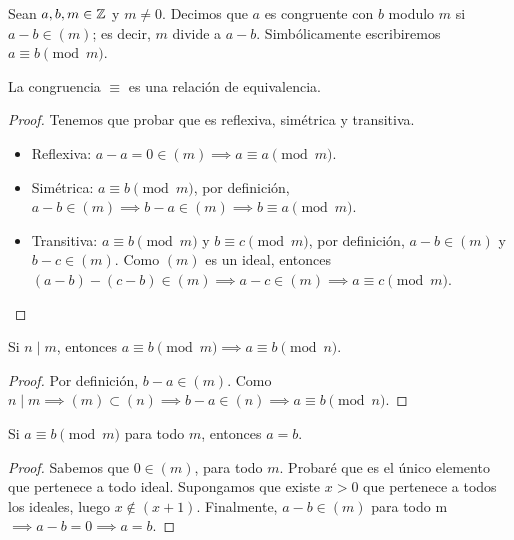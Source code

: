 \documentclass[main.tex]{subfiles}
\begin{document}
\begin{defn}
    Sean $a, b, m \in \mathbb Z$ y $m \not= 0$. Decimos que $a$ es congruente con $b$ modulo $m$ si $a - b \in (m)$; es decir, $m$ divide a $a - b$. Simb\'olicamente escribiremos $a \equiv b \pmod{m}$.
\end{defn}

\begin{proposition}
    La congruencia $\equiv$ es una relaci\'on de equivalencia.
\end{proposition}

\begin{proof}
    Tenemos que probar que es reflexiva, sim\'etrica y transitiva.
    \begin{itemize}
        \item Reflexiva: $a - a = 0 \in (m) \implies a \equiv a \pmod{m}$.
        \item Sim\'etrica: $a \equiv b \pmod{m}$, por definici\'on, $a - b \in (m) \implies b - a \in (m) \implies b \equiv a \pmod{m}$.
        \item Transitiva: $a \equiv b \pmod{m}$ y $b \equiv c \pmod{m}$, por definici\'on, $a - b \in (m)$ y $b - c \in (m)$. Como $(m)$ es un ideal, entonces $(a - b) - (c - b) \in (m) \implies a - c \in (m) \implies a \equiv c \pmod{m}$.
    \end{itemize}
\end{proof}

\begin{theorem}
    Si $n \mid m$, entonces $a \equiv b \pmod{m} \implies a \equiv b \pmod{n}$.
\end{theorem}

\begin{proof}
    Por definici\'on, $b - a \in (m)$. Como $n \mid m \implies (m) \subset (n) \implies b - a \in (n) \implies a \equiv b \pmod{n}$.
\end{proof}

\begin{theorem}
    Si $a \equiv b \pmod{m}$ para todo $m$, entonces $ a = b$.
\end{theorem}

\begin{proof}
    Sabemos que $0 \in (m)$, para todo $m$. Probar\'e que es el \'unico elemento que pertenece a todo ideal. Supongamos que existe $x > 0$ que pertenece a todos los ideales, luego $x \not\in (x + 1)$. Finalmente, $a - b \in (m)$ para todo m $\implies a - b = 0 \implies a = b$.
\end{proof}
\end{document}
